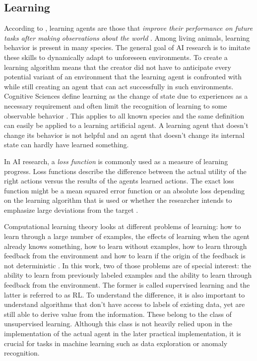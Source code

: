 \subsection{Learning}
\label{sec:learning} 

According to \cite{russell2016artificial}, learning agents are those that \emph{improve their performance on future
tasks after making observations about the world} \cite[p.693]{russell2016artificial}. Among living animals, learning
behavior is present in many species. The general goal of \ac{AI} research is to imitate these
skills to dynamically adapt
to unforeseen environments. To create a learning algorithm means that the creator did not have to anticipate every
potential variant of an environment that the learning agent is confronted with while still creating an agent that can act
successfully in such environments. Cognitive Sciences define learning as the change of state due to experiences as a
necessary requirement and often limit the recognition of learning to some observable behavior
\cite[p.96f.]{cognition1999}. This applies to all known species and the same definition can easily be applied to a
learning artificial agent. A learning agent that doesn't change its behavior is not helpful and an agent that
doesn't change its internal state can hardly have learned something.

In \ac{AI} research, a \emph{loss function} is commonly used as a measure of learning progress. Loss functions describe
the difference between the actual utility of the right actions versus the results of the agents learned actions. The
exact loss function might be a mean squared error function or an absolute loss depending on the learning algorithm that
is used or whether the researcher intends to emphasize large deviations from the target \cite[p.710]{russell2016artificial}.

Computational learning theory looks at different problems of learning: how to learn through a large number of
examples, the effects of learning when the agent already knows something, how to learn without examples, how to learn
through feedback from the environment and how to learn if the origin of the feedback is not deterministic
\cite[]{russell2016artificial}. In this work, two of those problems are of special interest: the ability to learn from
previously labeled examples and the ability to learn through feedback from the environment. The former is called
supervised learning and the latter is referred to as \acl{RL}. To understand the difference, it is also important to
understand algorithms that don't have access to labels of existing data, yet are still able to derive value from the
information. These belong to the class of unsupervised learning. Although this class is not heavily relied upon in the
implementation of the actual agent in the later practical implementation, it is crucial for tasks in machine
learning such as data exploration or anomaly recognition.

